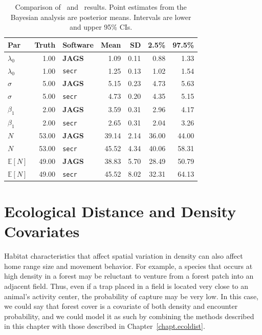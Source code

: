 \begin{table}%
\centering
\caption{Comparison of \secr~and \jags~results. Point estimates from
  the Bayesian analysis are posterior means. Intervals are lower and
  upper 95\% CIs.}
\begin{tabular}{lrlrrrr}
\hline
Par 	& Truth 	& Software 	& Mean 	& SD 	& 2.5\% & 97.5\% \\
\hline
$\lambda_0$ 	&  1.00 	& \textbf{JAGS} 	&  1.09 	& 0.11 	&  0.88 	&  1.33 \\
 $\lambda_0$ 	&  1.00 	& \texttt{secr} 	&  1.25 	& 0.13 	&  1.02 	&  1.54 \\
 $\sigma$ 	&  5.00 	& \textbf{JAGS} 	&  5.15 	& 0.23 	&  4.73 	&  5.63 \\
 $\sigma$ 	&  5.00 	& \texttt{secr} 	&  4.73 	& 0.20 	&  4.35 	&  5.15 \\
 $\beta_1$ 	&  2.00 	& \textbf{JAGS} 	&  3.59 	& 0.31 	&  2.96 	&  4.17 \\
 $\beta_1$ 	&  2.00 	& \texttt{secr} 	&  2.65 	& 0.31 	&  2.04 	&  3.26 \\
 $N$ 	& 53.00 	& \textbf{JAGS} 	& 39.14 	& 2.14 	& 36.00 	& 44.00 \\
 $N$ 	& 53.00 	& \texttt{secr} 	& 45.52 	& 4.34 	& 40.06 	& 58.31 \\
 $\mathbb{E}[N]$ 	& 49.00 	& \textbf{JAGS} 	& 38.83 	& 5.70 	& 28.49 	& 50.79 \\
 $\mathbb{E}[N]$ 	& 49.00 	& \texttt{secr} 	& 45.52 	& 8.02 	& 32.31 	& 64.13 \\
\hline
\end{tabular}
\label{state-space.tab.jagsVsecr}
\end{table}


\section{Ecological Distance and Density Covariates}

Habitat characteristics that affect spatial variation in density can also affect
home range size and movement behavior. For example, a
species that occurs at high density in a forest may be reluctant to
venture from a forest patch into an adjacent field. Thus, even if a
trap placed in a field is located very close to an animal's activity
center, the probability of capture may be very
low. In this case,  we could say that forest cover is a covariate of
both density and encounter probability,
and we could model it as such by combining the methods described in
this chapter with those described in Chapter~\ref{chapt.ecoldist}.

